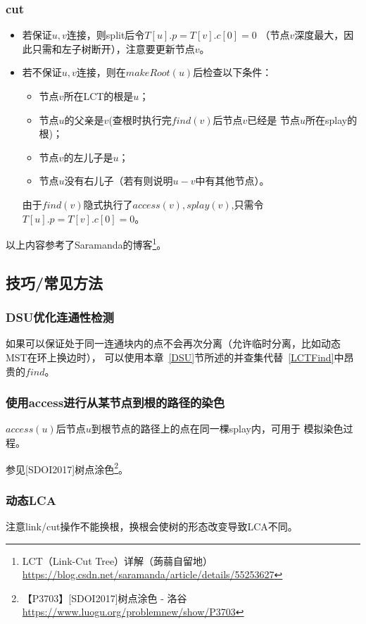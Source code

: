 \subsubsection{cut}

\begin{itemize}
    \item 若保证$u,v$连接，则split后令$T[u].p=T[v].c[0]=0$
    （节点$v$深度最大，因此只需和左子树断开），注意要更新节点$v$。
    \item 若不保证$u,v$连接，则在$makeRoot(u)$后检查以下条件：
    \begin{itemize}
        \item 节点$v$所在LCT的根是$u$；
        \item 节点$u$的父亲是$v$(查根时执行完$find(v)$后节点$v$已经是
        节点$u$所在splay的根)；
        \item 节点$v$的左儿子是$u$；
        \item 节点$u$没有右儿子（若有则说明$u-v$中有其他节点）。
    \end{itemize}
    由于$find(v)$隐式执行了$access(v),splay(v)$,只需令
    $T[u].p=T[v].c[0]=0$。
\end{itemize}

以上内容参考了Saramanda的博客\footnote{
    LCT（Link-Cut Tree）详解（蒟蒻自留地）
    \url{https://blog.csdn.net/saramanda/article/details/55253627}}。

\subsection{技巧/常见方法}
\subsubsection{DSU优化连通性检测}
如果可以保证处于同一连通块内的点不会再次分离（允许临时分离，比如动态MST在环上换边时），
可以使用本章~\ref{DSU}节所述的并查集代替~\ref{LCTFind}中昂贵的$find$。
\subsubsection{使用access进行从某节点到根的路径的染色}
$access(u)$后节点$u$到根节点的路径上的点在同一棵splay内，可用于
模拟染色过程。

参见[SDOI2017]树点涂色\footnote{【P3703】[SDOI2017]树点涂色 - 洛谷
    \url{https://www.luogu.org/problemnew/show/P3703}}。
\subsubsection{动态LCA}
注意link/cut操作不能换根，换根会使树的形态改变导致LCA不同。

